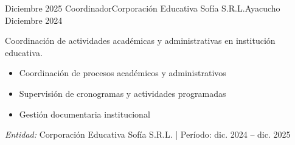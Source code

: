 \experience
{Diciembre 2025} {Coordinador}{Corporación Educativa Sofía S.R.L.}{Ayacucho}
{Diciembre 2024} {
	Coordinación de actividades académicas y administrativas en institución educativa.
	\begin{itemize}
		\item Coordinación de procesos académicos y administrativos
		\item Supervisión de cronogramas y actividades programadas
		\item Gestión documentaria institucional
	\end{itemize}
}
{\footnotesize{\emph{Entidad:} Corporación Educativa Sofía S.R.L. | Período: dic. 2024 -- dic. 2025}}
